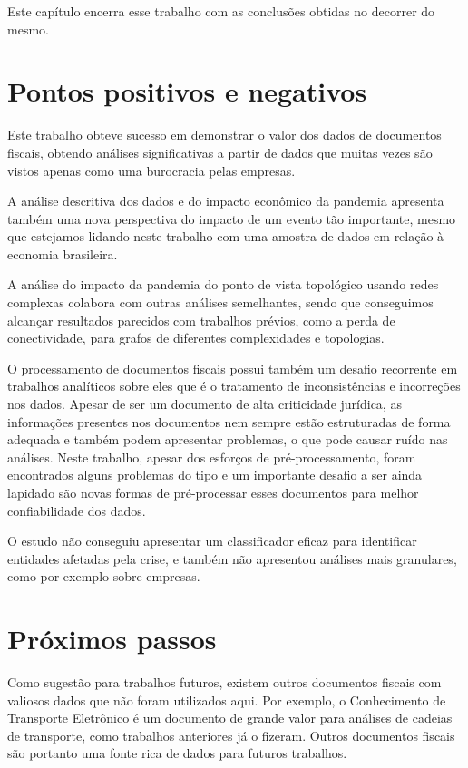 
Este capítulo encerra esse trabalho com as conclusões obtidas no decorrer do mesmo.

\section{Pontos positivos e negativos}

Este trabalho obteve sucesso em demonstrar o valor dos dados de documentos fiscais, obtendo análises significativas a partir de dados que muitas vezes são vistos apenas como uma burocracia pelas empresas.

A análise descritiva dos dados e do impacto econômico da pandemia apresenta também uma nova perspectiva do impacto de um evento tão importante, mesmo que estejamos lidando neste trabalho com uma amostra de dados em relação à economia brasileira.

A análise do impacto da pandemia do ponto de vista topológico usando redes complexas colabora com outras análises semelhantes, sendo que conseguimos alcançar resultados parecidos com trabalhos prévios, como a perda de conectividade, para grafos de diferentes complexidades e topologias.

O processamento de documentos fiscais possui também um desafio recorrente em trabalhos analíticos sobre eles que é o tratamento de inconsistências e incorreções nos dados. Apesar de ser um documento de alta criticidade jurídica, as informações presentes nos documentos nem sempre estão estruturadas de forma adequada e também podem apresentar problemas, o que pode causar ruído nas análises. Neste trabalho, apesar dos esforços de pré-processamento, foram encontrados alguns problemas do tipo e um importante desafio a ser ainda lapidado são novas formas de pré-processar esses documentos para melhor confiabilidade dos dados.

O estudo não conseguiu apresentar um classificador eficaz para identificar entidades afetadas pela crise, e também não apresentou análises mais granulares, como por exemplo sobre empresas.

\section{Próximos passos}

Como sugestão para trabalhos futuros, existem outros documentos fiscais com valiosos dados que não foram utilizados aqui. Por exemplo, o Conhecimento de Transporte Eletrônico é um documento de grande valor para análises de cadeias de transporte, como trabalhos anteriores já o fizeram. Outros documentos fiscais são portanto uma fonte rica de dados para futuros trabalhos.

